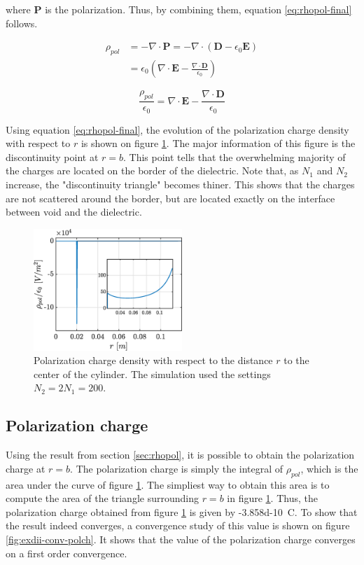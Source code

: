 \documentclass[a4paper,12pt,twoside]{article}
\newcommand{\mbf}[1]{\mathbf{#1}} %
\newcommand{\Div}[1]{\nabla\cdot\mathbf{#1}}
\newcommand{\bracket}[1]{\left(#1\right)}
\begin{document}
    where $\mbf{P}$ is the polarization.
    Thus, by combining them, equation \eqref{eq:rhopol-final} follows.

    \begin{align*}
      \rho_{pol} &= -\Div{\mbf{P}} = -\nabla\cdot\bracket{\mbf{D} - \epsilon_0\mbf{E}}\\
                 &= \epsilon_0\bracket{\Div{E} - \frac{\Div{D}}{\epsilon_0}}
    \end{align*}



    \begin{equation}
      \boxed{\frac{\rho_{pol}}{\epsilon_0} = \Div{E} - \frac{\Div{D}}{\epsilon_0}}
      \label{eq:rhopol-final}
    \end{equation}

    Using equation \eqref{eq:rhopol-final}, the evolution of the polarization charge density with respect to $r$ is shown on figure \ref{fig:rhopol}.
    The major information of this figure is the discontinuity point at $r=b$.
    This point tells that the overwhelming majority of the charges are located on the border of the dielectric.
    Note that, as $N_1$ and $N_2$ increase, the "discontinuity triangle" becomes thiner.
    This shows that the charges are not scattered around the border, but are located exactly on the interface between void and the dielectric.

    \begin{figure}[h]
      \centering
      \includegraphics[width=0.5\textwidth]{graphs/exdii-rhopol.eps}
      \caption{Polarization charge density with respect to the distance $r$ to the center of the cylinder. The simulation used the settings $N_2 = 2N_1 = 200$.}
      \label{fig:rhopol}
    \end{figure}


  \subsection{Polarization charge}
  Using the result from section \ref{sec:rhopol}, it is possible to obtain the polarization charge at $r=b$.
  The polarization charge is simply the integral of $\rho_{pol}$, which is the area under the curve of figure \ref{fig:rhopol}.
  The simpliest way to obtain this area is to compute the area of the triangle surrounding $r=b$ in figure \ref{fig:rhopol}.
  Thus, the polarization charge obtained from figure \ref{fig:rhopol} is given by \SI{-3.858d-10}{\coulomb}.
  To show that the result indeed converges, a convergence study of this value is shown on figure \ref{fig:exdii-conv-polch}.
  It shows that the value of the polarization charge converges on a first order convergence.
\end{document}
